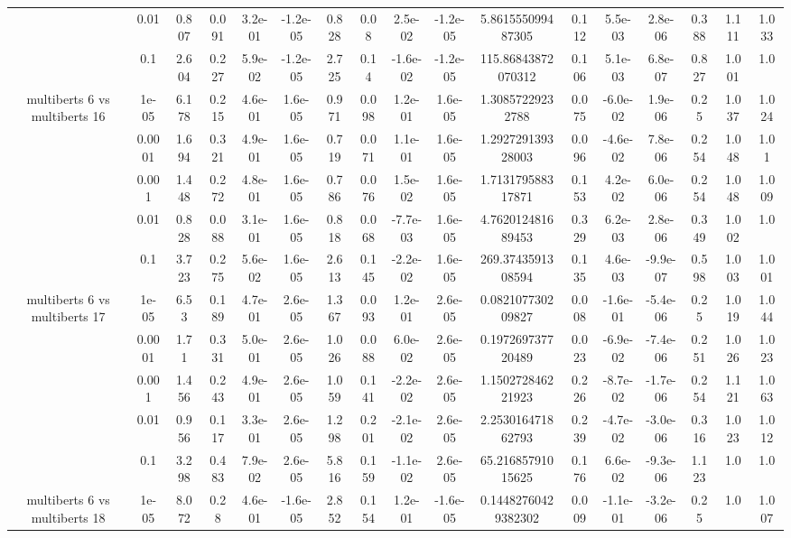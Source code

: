 \begin{tabular}{|c|c|c|c|c|c|c|c|c|c|c|c|c|c|c|c|c|}
 & 0.01 & 0.807 & 0.091 & 3.2e-01 & -1.2e-05 & 0.828 & 0.08 & 2.5e-02 & -1.2e-05 & 5.861555099487305 & 0.112 & 5.5e-03 & 2.8e-06 & 0.388 & 1.111 & 1.033 \\
 & 0.1 & 2.604 & 0.227 & 5.9e-02 & -1.2e-05 & 2.725 & 0.14 & -1.6e-02 & -1.2e-05 & 115.86843872070312 & 0.106 & 5.1e-03 & 6.8e-07 & 0.827 & 1.001 & 1.0 \\
\hline
\multirow{5}{*}{multiberts 6 vs multiberts 16} & 1e-05 & 6.178 & 0.215 & 4.6e-01 & 1.6e-05 & 0.971 & 0.098 & 1.2e-01 & 1.6e-05 & 1.30857229232788 & 0.075 & -6.0e-02 & 1.9e-06 & 0.25 & 1.037 & 1.024 \\
 & 0.0001 & 1.694 & 0.321 & 4.9e-01 & 1.6e-05 & 0.719 & 0.071 & 1.1e-01 & 1.6e-05 & 1.292729139328003 & 0.096 & -4.6e-02 & 7.8e-06 & 0.254 & 1.048 & 1.01 \\
 & 0.001 & 1.448 & 0.272 & 4.8e-01 & 1.6e-05 & 0.786 & 0.076 & 1.5e-02 & 1.6e-05 & 1.713179588317871 & 0.153 & 4.2e-02 & 6.0e-06 & 0.254 & 1.048 & 1.009 \\
 & 0.01 & 0.828 & 0.088 & 3.1e-01 & 1.6e-05 & 0.818 & 0.068 & -7.7e-03 & 1.6e-05 & 4.762012481689453 & 0.329 & 6.2e-03 & 2.8e-06 & 0.349 & 1.002 & 1.0 \\
 & 0.1 & 3.723 & 0.275 & 5.6e-02 & 1.6e-05 & 2.613 & 0.145 & -2.2e-02 & 1.6e-05 & 269.3743591308594 & 0.135 & 4.6e-03 & -9.9e-07 & 0.598 & 1.003 & 1.001 \\
\hline
\multirow{5}{*}{multiberts 6 vs multiberts 17} & 1e-05 & 6.53 & 0.189 & 4.7e-01 & 2.6e-05 & 1.367 & 0.093 & 1.2e-01 & 2.6e-05 & 0.082107730209827 & 0.008 & -1.6e-01 & -5.4e-06 & 0.25 & 1.019 & 1.044 \\
 & 0.0001 & 1.71 & 0.331 & 5.0e-01 & 2.6e-05 & 1.026 & 0.088 & 6.0e-02 & 2.6e-05 & 0.197269737720489 & 0.023 & -6.9e-02 & -7.4e-06 & 0.251 & 1.026 & 1.023 \\
 & 0.001 & 1.456 & 0.243 & 4.9e-01 & 2.6e-05 & 1.059 & 0.141 & -2.2e-02 & 2.6e-05 & 1.150272846221923 & 0.226 & -8.7e-02 & -1.7e-06 & 0.254 & 1.121 & 1.063 \\
 & 0.01 & 0.956 & 0.117 & 3.3e-01 & 2.6e-05 & 1.298 & 0.201 & -2.1e-02 & 2.6e-05 & 2.253016471862793 & 0.239 & -4.7e-02 & -3.0e-06 & 0.316 & 1.023 & 1.012 \\
 & 0.1 & 3.298 & 0.483 & 7.9e-02 & 2.6e-05 & 5.816 & 0.159 & -1.1e-02 & 2.6e-05 & 65.21685791015625 & 0.176 & 6.6e-02 & -9.3e-06 & 1.123 & 1.0 & 1.0 \\
\hline
\multirow{5}{*}{multiberts 6 vs multiberts 18} & 1e-05 & 8.072 & 0.28 & 4.6e-01 & -1.6e-05 & 2.852 & 0.154 & 1.2e-01 & -1.6e-05 & 0.14482760429382302 & 0.009 & -1.1e-01 & -3.2e-06 & 0.25 & 1.0 & 1.007 \\

\end{tabular}
